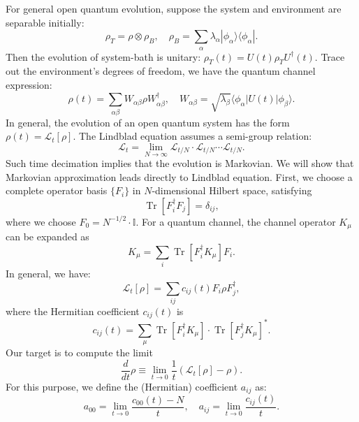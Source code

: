 \documentclass[aps,prb,superscriptaddress,nofootinbib]{revtex4}
\def \Tr{\operatorname{Tr}}
\begin{document}
For general open quantum evolution, suppose the system and environment are separable initially:
\begin{equation}
	\rho_T=\rho\otimes\rho_B,\quad \rho_B=\sum_\alpha \lambda_\alpha |\phi_\alpha\rangle\langle\phi_\alpha |.
\end{equation}
Then the evolution of system-bath is unitary: $\rho_T(t) = U(t)\rho_TU^\dagger(t)$.
Trace out the environment's degrees of freedom, we have the quantum channel expression:
\begin{equation}
	\rho(t) = \sum_{\alpha\beta} W_{\alpha\beta} \rho W^\dagger_{\alpha\beta},
	\quad W_{\alpha\beta} = \sqrt{\lambda_\beta} \langle\phi_\alpha|U(t)|\phi_\beta\rangle.
\end{equation}
In general, the evolution of an open quantum system has the form $\rho(t) = \mathcal{L}_t[\rho]$.
The Lindblad equation assumes a semi-group relation:
\begin{equation}
	\mathcal{L}_t = \lim_{N \rightarrow \infty} \mathcal{L}_{t/N}\cdot\mathcal{L}_{t/N}\cdots \mathcal{L}_{t/N}.
\end{equation}
Such time decimation implies that the evolution is Markovian.
We will show that Markovian approximation leads directly to Lindblad equation.
First, we choose a complete operator basis $\{F_i\}$ in $N$-dimensional Hilbert space, satisfying
\begin{equation}
	\Tr[F_i^\dagger F_j] = \delta_{ij},
\end{equation}
where we choose $F_0=N^{-1/2} \cdot\mathbb I$. 
For a quantum channel, the channel operator $K_\mu$ can be expanded as
\begin{equation}
	K_\mu = \sum_i \Tr[F_i^\dagger K_\mu]F_i.
\end{equation}
In general, we have:
\begin{equation}
	\mathcal{L}_t[\rho] = \sum_{ij}c_{ij}(t)F_i\rho F_j^\dagger,
\end{equation}
where the Hermitian coefficient $c_{ij}(t)$ is
\begin{equation}
	c_{ij}(t) = \sum_{\mu} \Tr[F_i^\dagger K_\mu]\cdot \Tr[F_j^\dagger K_\mu]^*.
\end{equation}
Our target is to compute the limit
\begin{equation}
	\frac{d}{dt} \rho \equiv \lim_{t\rightarrow 0} \frac{1}{t}(\mathcal{L}_t[\rho]-\rho).
\end{equation}
For this purpose, we define the (Hermitian) coefficient $a_{ij}$ as:
\begin{equation}
	a_{00} = \lim_{t\rightarrow 0} \frac{c_{00}(t)-N}{t}, \quad
	a_{ij} = \lim_{t\rightarrow 0} \frac{c_{ij}(t)}{t}.
\end{equation}
\end{document}
